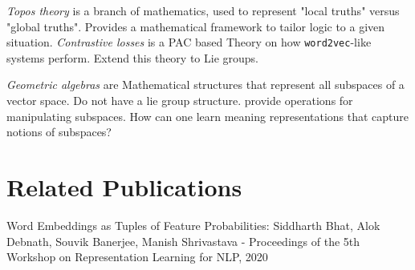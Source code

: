 \documentclass[11pt]{book}
\begin{document}
\emph{Topos theory} is a branch of mathematics, used to represent "local truths" versus "global truths". Provides a mathematical framework to tailor logic to a given situation.
\emph{Contrastive losses} is a PAC based Theory on how \texttt{word2vec}-like systems perform. Extend this theory to Lie groups.

\emph{Geometric algebras} are Mathematical structures that represent all subspaces of a vector space. Do not have a lie group structure.
provide operations for manipulating subspaces. How can one learn meaning representations that capture notions of subspaces?



\chapter*{Related Publications}
\label{ch:relatedPubs}
% 


Word Embeddings as Tuples of Feature Probabilities: Siddharth Bhat, Alok Debnath, Souvik Banerjee, Manish Shrivastava - Proceedings of the 5th Workshop on Representation Learning for NLP, 2020




 
\end{document}
